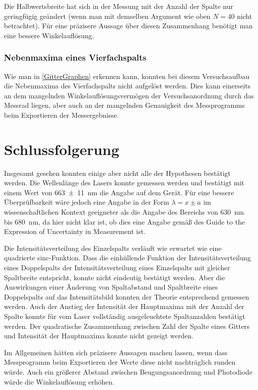 \documentclass[
	a4paper,
	12pt,
	pagesize,
	ngerman
]{scrartcl}
\begin{document}
	Die Halbwertsbreite hat sich in der Messung mit der Anzahl der Spalte nur geringfügig geändert (wenn man mit demselben Argument wie oben $N=40$ nicht betrachtet).
	Für eine präzisere Aussage über diesen Zusammenhang benötigt man eine bessere Winkelauflösung.
	\subsubsection{Nebenmaxima eines Vierfachspalts}
	Wie man in \cref{GitterGraphen} erkennen kann, konnten bei diesem Versuchsaufbau die Nebenmaxima des Vierfachspalts nicht aufgelöst werden.
	Dies kann einerseits an dem mangelnden Winkelauflösungsvermögen der Versuchsanordnung durch das Messrad liegen, aber auch an der mangelnden Genauigkeit des Messprogramms beim Exportieren der Messergebnisse.
	
	

	
	\section{Schlussfolgerung}
	Insgesamt gesehen konnten einige aber nicht alle der Hypothesen bestätigt werden.
	Die Wellenlänge des Lasers konnte gemessen werden und bestätigt mit einem Wert von \SI{663\pm 11}{nm} die Angabe auf dem Gerät.
	Für eine bessere Überprüfbarkeit wäre jedoch eine Angabe in der Form $\lambda = x\pm a$ im wissenschaftlichen Kontext geeigneter als die Angabe des Bereichs von \SI{630}{\nano \meter} bis \SI{680}{\nano \meter}, da hier nicht klar ist, ob dies eine Angabe gemäß des Guide to the Expression of Uncertainty in Measurement ist.
	
	Die Intensitätsverteilung des Einzelspalts verläuft wie erwartet wie eine quadrierte sinc-Funktion.
	Dass die einhüllende Funktion der Intensitätsverteilung eines Doppelspalts der Intensitätsverteilung eines Einzelspalts mit gleicher Spaltbreite entspricht, konnte nicht eindeutig bestätigt werden.
	Aber die Auswirkungen einer Änderung von Spaltabstand und Spaltbreite eines Doppelspalts auf das Intensitätsbild konnten der Theorie entsprechend gemessen werden.
	Auch der Anstieg der Intensität der Hauptmaxima mit der Anzahl der Spalte konnte für vom Laser vollständig ausgeleuchtete Spaltanzahlen bestätigt werden.
	Der quadratische Zusammenhang zwischen Zahl der Spalte eines Gitters und Intensität der Hauptmaxima konnte nicht gezeigt werden.
	
	Im Allgemeinen hätten sich präzisere Aussagen machen lassen, wenn dass Messprogramm beim Exportieren der Werte diese nicht nachträglich runden würde.
	Auch ein größerer Abstand zwischen Beugungsanordnung und Photodiode würde die Winkelauflösung erhöhen.
	
	\printbibliography
\end{document}
